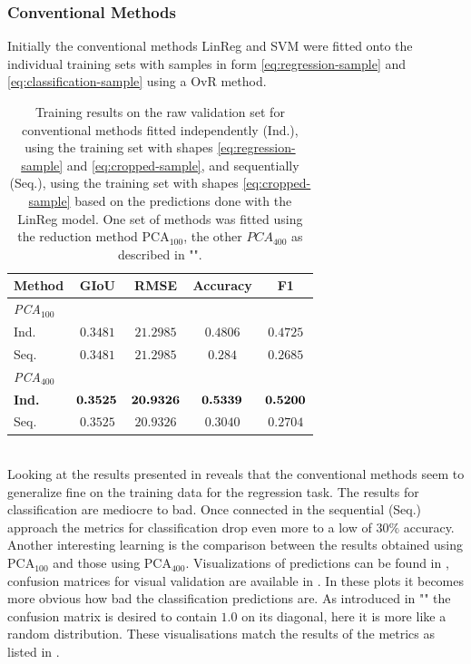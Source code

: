 \subsubsection{Conventional Methods}
Initially the conventional methods LinReg and SVM were fitted onto the individual training sets with samples in form \eqref{eq:regression-sample} and \eqref{eq:classification-sample} using a OvR method.
\begin{table}[!ht]
    \centering
    \begin{tabular}{|l|c|c|c|c|}
        \hline
        \textbf{Method} & \textbf{GIoU} & \textbf{RMSE}  & \textbf{Accuracy} & \textbf{F1} \\
        \hline
        \hline
        \multicolumn{5}{|l|}{\textit{PCA${}_{100}$} }
        \\
        \hline
        Ind. & $0.3481$ & $21.2985$ &$0.4806$ & $0.4725$\\
        Seq. & $0.3481$ & $21.2985$ & $0.284$ & $0.2685$ \\
        \hline
        \hline
        \multicolumn{5}{|l|}{\textit{PCA${}_{400}$} }
        \\
        \hline
        \textbf{Ind.} & $\bm{0.3525}$ & $\bm{20.9326}$ &$\bm{0.5339}$ & $\bm{0.5200}$\\
        Seq. & $0.3525$ & $20.9326$ & $0.3040$ & $0.2704$ \\
        \hline
    \end{tabular}
    \caption{Training results on the raw validation set for conventional methods fitted independently (Ind.), using the training set with shapes \eqref{eq:regression-sample} and \eqref{eq:cropped-sample}, and sequentially (Seq.), using the training set with shapes \eqref{eq:cropped-sample} based on the predictions done with the LinReg model. One set of methods was fitted using the reduction method $\text{PCA}_{100}$, the other $PCA_{400}$ as described in ""\footnotemark.
    }
    \label{fig:conventional-results}
\end{table}
\\
Looking at the results presented in  reveals that the conventional methods seem to generalize fine on the training data for the regression task.
The results for classification are mediocre to bad.
Once connected in the sequential (Seq.) approach the metrics for classification drop even more to a low of $30\%$ accuracy.
Another interesting learning is the comparison between the results obtained using $\text{PCA}_{100}$ and those using $\text{PCA}_{400}$.
Visualizations of predictions can be found in , confusion matrices for visual validation are available in .
In these plots it becomes more obvious how bad the classification predictions are.
As introduced in "" the confusion matrix is desired to contain $1.0$ on its diagonal, here it is more like a random distribution.
These visualisations match the results of the metrics as listed in .

